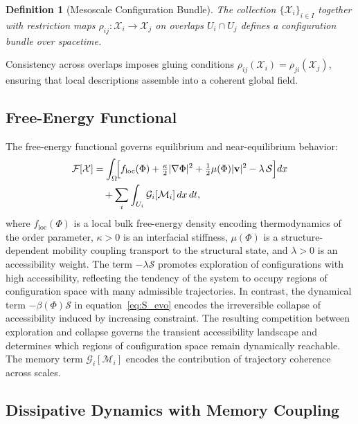 \documentclass[11pt, a4paper, twocolumn]{article}
\newtheorem{definition}{Definition}[section]
\newcommand{\X}{\mathcal{X}}
\newcommand{\Sfield}{\mathcal{S}}
\newcommand{\F}{\mathcal{F}}
\begin{document}
\begin{definition}[Mesoscale Configuration Bundle]
The collection $\{\X_i\}_{i \in I}$ together with restriction maps
$\rho_{ij} : \X_i \to \X_j$ on overlaps $U_i \cap U_j$ defines a configuration
bundle over spacetime.
\end{definition}

Consistency across overlaps imposes gluing conditions
$\rho_{ij}(\X_i) = \rho_{ji}(\X_j)$, ensuring that local descriptions
assemble into a coherent global field.

\subsection{Free-Energy Functional}

The free-energy functional governs equilibrium and near-equilibrium behavior:
\begin{align}
    \F[\X]
    &=
    \int_{\Omega}
    \!\Bigl[
        f_{\mathrm{loc}}(\Phi)
        + \tfrac{\kappa}{2}|\nabla \Phi|^2
        + \tfrac{1}{2}\mu(\Phi)|\mathbf{v}|^2
        - \lambda\,\Sfield
    \Bigr] dx
    \notag\\
    &\quad+
    \sum_i \int_{U_i} \mathcal{G}_i[\mathcal{M}_i]\,dx\,dt,
    \label{eq:free_energy}
\end{align}
where $f_{\mathrm{loc}}(\Phi)$ is a local bulk free-energy density encoding
thermodynamics of the order parameter, $\kappa > 0$ is an interfacial stiffness,
$\mu(\Phi)$ is a structure-dependent mobility coupling transport to the
structural state, and $\lambda > 0$ is an accessibility weight. The term
$-\lambda\Sfield$ promotes exploration of configurations with high accessibility,
reflecting the tendency of the system to occupy regions of configuration space
with many admissible trajectories. In contrast, the dynamical term
$-\beta(\Phi)\Sfield$ in equation~\eqref{eq:S_evo} encodes the irreversible
collapse of accessibility induced by increasing constraint. The resulting
competition between exploration and collapse governs the transient accessibility
landscape and determines which regions of configuration space remain dynamically
reachable. The memory term $\mathcal{G}_i[\mathcal{M}_i]$ encodes the
contribution of trajectory coherence across scales.

\subsection{Dissipative Dynamics with Memory Coupling}
\end{document}
